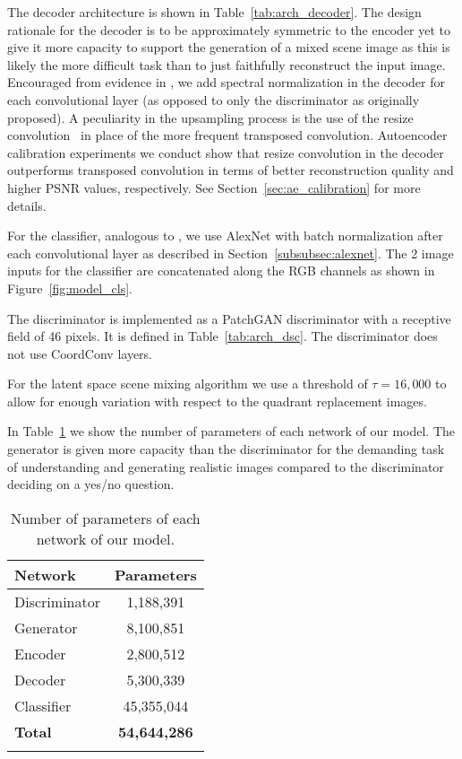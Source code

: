 \documentclass[a4paper,12pt]{report}
\begin{document}
The decoder architecture is shown in Table~\ref{tab:arch_decoder}. The design rationale for the decoder is to be approximately symmetric to the encoder yet to give it more capacity to support the generation of a mixed scene image as this is likely the more difficult task than to just faithfully reconstruct the input image. Encouraged from evidence in \cite{SAGAN}, we add spectral normalization in the decoder for each convolutional layer (as opposed to only the discriminator as originally proposed). A peculiarity in the upsampling process is the use of the resize convolution~\cite{ResizeConv} in place of the more frequent transposed convolution. Autoencoder calibration experiments we conduct show that resize convolution in the decoder outperforms transposed convolution in terms of better reconstruction quality and higher PSNR values, respectively. See Section~\ref{sec:ae_calibration} for more details.




For the classifier, analogous to \cite{DisentFacOfVarByMixTh}, we use AlexNet with batch normalization after each convolutional layer as described in Section~\ref{subsubsec:alexnet}. The 2 image inputs for the classifier are concatenated along the RGB channels as shown in  Figure~\ref{fig:model_cls}.

The discriminator is implemented as a PatchGAN discriminator with a receptive field of 46 pixels. It is defined in Table~\ref{tab:arch_dsc}. The discriminator does not use CoordConv layers.



For the latent space scene mixing algorithm we use a threshold of $\tau = 16,000$ to allow for enough variation with respect to the quadrant replacement images.

In Table~\ref{tab:params} we show the number of parameters of each network of our model. The generator is given more capacity than the discriminator for the demanding task of understanding and generating realistic images compared to the discriminator deciding on a yes/no question.
\begin{table} [ht!]
\centering
\begin{tabular}{l|c}
\Xhline{0.8pt}
\textbf{Network} & \textbf{Parameters}\\
\hline
Discriminator & 1,188,391 \\
\hline
Generator & 8,100,851 \\
\quad Encoder & 2,800,512 \\
\quad Decoder & 5,300,339 \\
\hline
Classifier & 45,355,044 \\
\hline
\textbf{Total} & \textbf{54,644,286} \\
\Xhline{0.8pt}
\end{tabular}
\caption{Number of parameters of each network of our model.} \label{tab:params}
\end{table}
\end{document}
